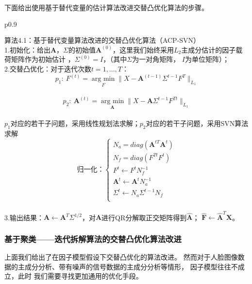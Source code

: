 下面给出使用基于替代变量的估计算法改进交替凸优化算法的步骤。
\begin{table}[H]%
    \centering%
    \begin{tabular}{{p{0.9\columnwidth}}}%
    
    \toprule%
    算法4.1：基于替代变量算法改进的交替凸优化算法（ACP-SVN） \\
    \midrule%
    1.初始化：给出$\bm{A}$，$\Sigma$的初始值$\bm{A}^{(0)}$，这里我们始终采用$L_2$主成分估计的因子载荷矩阵作为初始估计
    ，$\Sigma^{(0)} = I$，（其中$\Sigma$为一对角矩阵，
    $I$为单位矩阵）； \\

    2.交替凸优化：对于迭代次数$t = 1, ..., T$： \\
    $$p_1:\ F^{(t)} = \underset{F}{\operatorname{arg\ min}} \|X - \bm{A}^{(t-1)}\Sigma^{t-1}F^{T}\|_{L_1}$$ \\
    $$p_2:\ \bm{A}^{(t)} = \underset{\bm{A}}{\operatorname{arg\ min}} \|X - \bm{A}\Sigma^{t-1}F^{Tt} \|_{L_1}$$ \\
    $p_1$对应的若干子问题，采用线性规划法求解；$p_2$对应的若干子问题，采用SVN算法求解\\
    \begin{equation*}
        \text{归一化：}\left\{
                    \begin{array}{clr}
                    N_a = diag(\bm{A}^{tT}\bm{A}^{t})\\
                    N_f = diag(F^{Tt}F^{t})\\
                    F^{t} \leftarrow F^{t}N_f^{-1}\\
                    \bm{A}^{t}\leftarrow \bm{A}^{t}N_a^{-1}\\
                    \Sigma^{t} \leftarrow N_a\Sigma^{t-1}N_f\\
                    \end{array}
        \right.
    \end{equation*} \\

    3.输出结果：$\bm{A} \leftarrow \bm{A}^T\Sigma^{1/2}$，对$\bm{A}$进行QR分解取正交矩阵得到$\hat{\bm{A}}$；
    $\hat{\bm{F}} \leftarrow \hat{\bm{A}}^T\bm{X}$。
     \\
    \bottomrule%
    \end{tabular}
\end{table}%

\subsubsection{基于聚类——迭代拆解算法的交替凸优化算法改进}
上面我们给出了在因子模型假设下交替凸优化的算法改进。
然而对于人脸图像数据的主成分分析、带有噪声的信号数据的主成分分析等情形，
因子模型往往不成立，此时
我们需要寻找更加通用的优化手段。

